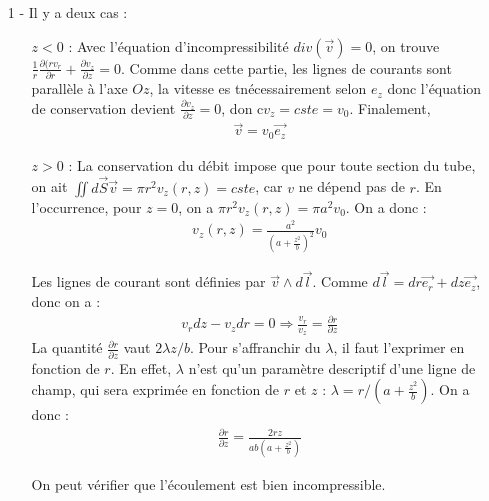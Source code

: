 \documentclass{report}
\begin{document}
\begin{itemize}
	\item[1 - ] Il y a deux cas : 
	 
	\begin{itemize}
		\item[$z<0$ : ] Avec l'équation d'incompressibilité $div(\vec{v})=0$, on trouve $\frac{1}{r}\frac{\partial(r v_r}{\partial r}+\frac{\partial v_z}{\partial z} =0$. Comme dans cette partie, les lignes de courants sont parallèle à l'axe $Oz$, la vitesse es tnécessairement selon $e_z$ donc l'équation de conservation devient $\frac{\partial v_z}{\partial z} =0$, don c$v_z=cste=v_0$. Finalement,
		\begin{align*}
			\vec{v}=v_0\vec{e_z}
		\end{align*}
		
		\item[$z>0$ : ] 	La conservation du débit impose que pour toute section du tube, on ait $\iint d\vec{S}\vec{v}= \pi r^2v_z(r,z)=cste$, car $v$ ne dépend pas de $r$. En l'occurrence, pour $z=0$, on a $\pi r^2v_z(r,z)=\pi a^2v_0$. On a donc : 
\begin{align*}
	v_z(r,z)=\frac{a^2}{\left(a+\frac{z^2}{b} \right)^2 }v_0
\end{align*}	

Les lignes de courant sont définies par $\vec{v}\wedge d\vec{l}$. Comme $d\vec{l}=dr\vec{e_r}+dz\vec{e_z}$, donc on a :
\begin{align*}
	v_rdz-v_zdr=0\Longrightarrow \frac{v_r}{v_z}=\frac{\partial r}{\partial z}
\end{align*}
La quantité $\frac{\partial r}{\partial z}$ vaut $2\lambda z/b$. Pour s'affranchir du $\lambda$, il faut l'exprimer en fonction de $r$. En effet, $\lambda$ n'est qu'un paramètre descriptif d'une ligne de champ, qui sera exprimée en fonction de $r$ et $z$ : $\lambda=r/(a+\frac{z^2}{b})$. On a donc :
\begin{align*}
	\frac{\partial r}{\partial z}=\frac{2rz}{ab\left( a+\frac{z^2}{b}\right) }
\end{align*}

\noindent{}
	
	On peut vérifier que l'écoulement est bien incompressible. 
	\end{itemize}


\end{itemize}
\end{document}
